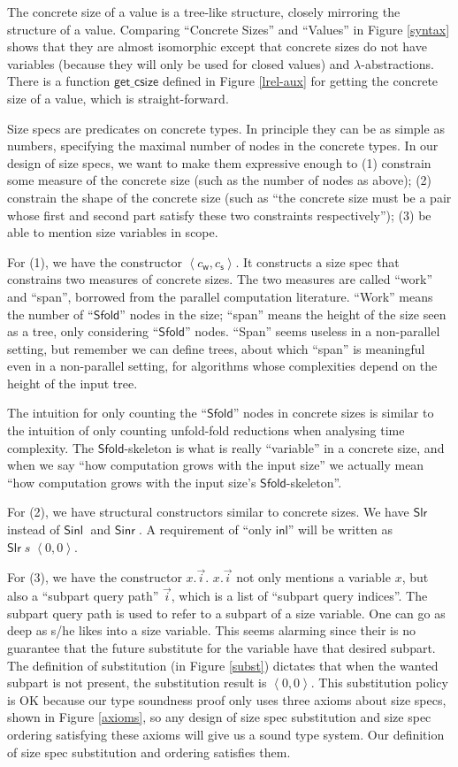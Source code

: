 \documentclass[preprint]{sigplanconf}
\newcommand{\syminl}{\mathsf{inl}}
\newcommand{\symSinl}{\mathsf{Sinl\;}}
\newcommand{\symSinr}{\mathsf{Sinr\;}}
\newcommand{\symSfold}{\mathsf{Sfold}}
\newcommand{\getcsize}{\mathsf{get\_csize}}
\newcommand{\symSlr}{\mathsf{Slr}}
\newcommand{\symwork}{\mathsf{w}}
\newcommand{\symspan}{\mathsf{s}}
\newcommand{\Sstats}[1]{\left \langle #1 \right \rangle}
\begin{document}
The concrete size of a value is a tree-like structure, closely mirroring the structure of a value. Comparing ``Concrete Sizes'' and ``Values'' in Figure \ref{syntax} shows that they are almost isomorphic except that concrete sizes do not have variables (because they will only be used for closed values) and $\lambda$-abstractions. There is a function $\getcsize$ defined in Figure \ref{lrel-aux} for getting the concrete size of a value, which is straight-forward.

Size specs are predicates on concrete types. In principle they can be as simple as numbers, specifying the maximal number of nodes in the concrete types. In our design of size specs, we want to make them expressive enough to (1) constrain some measure of the concrete size (such as the number of nodes as above); (2) constrain the shape of the concrete size (such as ``the concrete size must be a pair whose first and second part satisfy these two constraints respectively''); (3) be able to mention size variables in scope.

For (1), we have the constructor $\Sstats{c_\symwork,c_\symspan}$. It constructs a size spec that constrains two measures of concrete sizes. The two measures are called ``work'' and ``span'', borrowed from the parallel computation literature. ``Work'' means the number of ``$\symSfold$'' nodes in the size; ``span'' means the height of the size seen as a tree, only considering ``$\symSfold$'' nodes. ``Span'' seems useless in a non-parallel setting, but remember we can define trees, about which ``span'' is meaningful even in a non-parallel setting, for algorithms whose complexities depend on the height of the input tree. 

The intuition for only counting the  ``$\symSfold$'' nodes in concrete sizes is similar to the intuition of only counting unfold-fold reductions when analysing time complexity. The $\symSfold$-skeleton is what is really ``variable'' in a concrete size, and when we say ``how computation grows with the input size'' we actually mean ``how computation grows with the input size's $\symSfold$-skeleton''.

For (2), we have structural constructors similar to concrete sizes. We have $\symSlr$ instead of $\symSinl$ and $\symSinr$. A requirement of ``only $\syminl$'' will be written as $\symSlr\;s\;\Sstats{0,0}$.

For (3), we have the constructor $x.\vec{i}$. $x.\vec{i}$ not only mentions a variable $x$, but also a ``subpart query path'' $\vec{i}$, which is a list of ``subpart query indices''. The subpart query path is used to refer to a subpart of a size variable. One can go as deep as s/he likes into a size variable. This seems alarming since their is no guarantee that the future substitute for the variable have that desired subpart. The definition of substitution (in Figure \ref{subst}) dictates that when the wanted subpart is not present, the substitution result is $\Sstats{0,0}$. This substitution policy is OK because our type soundness proof only uses three axioms about size specs, shown in Figure \ref{axioms}, so any design of size spec substitution and size spec ordering satisfying these axioms will give us a sound type system. Our definition of size spec substitution and ordering satisfies them. 
\end{document}
